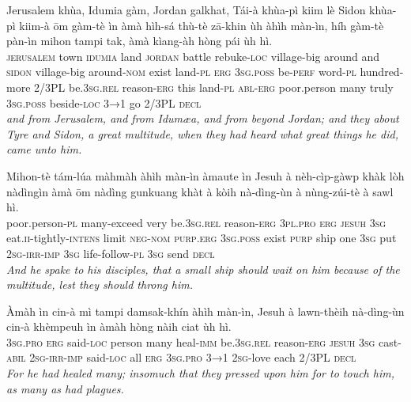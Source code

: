 \documentclass[11pt,a4paper]{article}
\begin{document}
\begin{exe}
\gll Jerusalem khùa, Idumia gàm, Jordan galkhat, Tái-à khùa-pì kiim lè Sidon khùa-pì kiim-à ōm gàm-tè ìn àmà hìh-sá thù-tè zā-khin ùh àhìh màn-ìn, híh gàm-tè pàn-ìn mihon tampi tak, àmà kìang-àh hòng pái ùh hì. \\
     \textsc{jerusalem} town \textsc{idumia} land \textsc{jordan} battle rebuke-\textsc{loc} village-big around and \textsc{sidon} village-big around-\textsc{nom} exist land-\textsc{pl} \textsc{erg} \textsc{3sg}.\textsc{poss} be-\textsc{perf} word-\textsc{pl} hundred-more 2/3PL be.\textsc{3sg}.\textsc{rel} reason-\textsc{erg} this land-\textsc{pl} \textsc{abl}-\textsc{erg} poor.person many truly \textsc{3sg}.\textsc{poss} beside-\textsc{loc} \textsc{3→1} go 2/3PL \textsc{decl} \\
\glt \textcolor{kjvcolor}{\textit{and from Jerusalem, and from Idumæa, and from beyond Jordan; and they about Tyre and Sidon, a great multitude, when they had heard what great things he did, came unto him.}}

\gll Mihon-tè tám-lúa màhmàh àhìh màn-ìn àmaute ìn Jesuh à nèh-cìp-gàwp khàk lòh nàdìngìn àmà ōm nàdìng gunkuang khàt à kòih nà-dìng-ùn à nùng-zúi-tè à sawl hì. \\
     poor.person-\textsc{pl} many-exceed very be.\textsc{3sg}.\textsc{rel} reason-\textsc{erg} \textsc{3pl}.\textsc{pro} \textsc{erg} \textsc{jesuh} \textsc{3sg} eat.\textsc{ii}-tightly-\textsc{intens} limit \textsc{neg}-\textsc{nom} \textsc{purp}.\textsc{erg} \textsc{3sg}.\textsc{poss} exist \textsc{purp} ship one \textsc{3sg} put \textsc{2sg}-\textsc{irr}-\textsc{imp} \textsc{3sg} life-follow-\textsc{pl} \textsc{3sg} send \textsc{decl} \\
\glt \textcolor{kjvcolor}{\textit{And he spake to his disciples, that a small ship should wait on him because of the multitude, lest they should throng him.}}

\gll Àmàh ìn cin-à mì tampi damsak-khín àhìh màn-ìn, Jesuh à lawn-thèih nà-dìng-ùn cin-à khèmpeuh ìn àmàh hòng nàih ciat ùh hì. \\
     \textsc{3sg}.\textsc{pro} \textsc{erg} said-\textsc{loc} person many heal-\textsc{imm} be.\textsc{3sg}.\textsc{rel} reason-\textsc{erg} \textsc{jesuh} \textsc{3sg} cast-\textsc{abil} \textsc{2sg}-\textsc{irr}-\textsc{imp} said-\textsc{loc} all \textsc{erg} \textsc{3sg}.\textsc{pro} \textsc{3→1} \textsc{2sg}-love each 2/3PL \textsc{decl} \\
\glt \textcolor{kjvcolor}{\textit{For he had healed many; insomuch that they pressed upon him for to touch him, as many as had plagues.}}


\end{exe}
\end{document}
